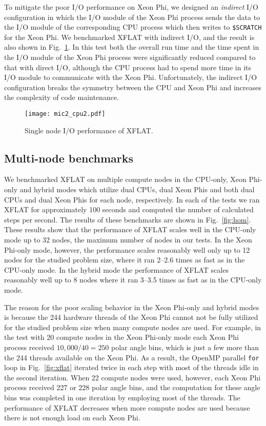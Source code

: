 \documentclass{sig-alternate}
\begin{document}
To mitigate the poor I/O
performance on Xeon Phi, we designed an \emph{indirect} I/O
configuration in which the I/O module of the Xeon Phi process sends
the data to the I/O module of the corresponding CPU
process which then writes to \texttt{\$SCRATCH} for the Xeon Phi. 
We benchmarked XFLAT with indirect I/O, and the result is also shown
in Fig.~\ref{fig:io}. In this test both the overall run time and the
time spent in 
the I/O module of the Xeon Phi process
were significantly reduced compared to that with direct I/O, although
the CPU process had to spend more time in its I/O module to
communicate with the Xeon Phi.
Unfortunately, the indirect I/O configuration breaks the
symmetry between the CPU and Xeon Phi and increases the
complexity of code maintenance.

\begin{figure}
\centering
\texttt{[image: mic2\_cpu2.pdf]}
\caption{Single node I/O performance of XFLAT.}
\label{fig:io}
\end{figure}



\subsection{Multi-node benchmarks}

We benchmarked XFLAT on multiple compute nodes in the CPU-only, Xeon
Phi-only and hybrid modes which utilize dual CPUs, dual
Xeon Phis and both dual CPUs and dual Xeon Phis for each node, respectively. 
In each of the tests we ran XFLAT for approximately 100 seconds and
computed the number of calculated steps per second. The
results of these benchmarks are shown in Fig.~\ref{fig:hom}.
These results show that the performance of XFLAT scales well in the CPU-only
mode up to 32 nodes, the maximum number of nodes in our
tests. In the Xeon Phi-only mode, however, the performance
scales reasonably well only up to 
12 nodes for the studied problem size, where it
ran 2--2.6 times as fast as in the CPU-only mode. 
In the hybrid mode the performance of
XFLAT scales reasonably well up to 8 nodes where it ran 3--3.5 times as
fast as in the CPU-only mode.

The reason for the poor scaling behavior in the Xeon Phi-only and
hybrid modes is 
because the 244 hardware threads of the Xeon Phi cannot not be fully
utilized for the studied problem size when many compute nodes are used.
For example, in the test with 20 compute nodes in the Xeon Phi-only mode
each Xeon Phi process received
$10,000/40=250$ polar angle bins, which is just a few more than the
244 threads available on the Xeon Phi. As a result, the OpenMP parallel
\texttt{for} loop in 
Fig.~\ref{fig:xflat} iterated twice in each step with most of the
threads idle in the second iteration. 
When 22 compute nodes were used, however, each Xeon Phi process received
227 or 228 polar angle bins, and the computation for these angle bins
was completed in one iteration by employing most of the
threads. The performance of XFLAT decreases when more compute nodes
are used because there is not enough load on each Xeon Phi.
\end{document}
